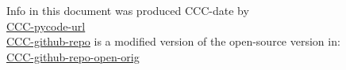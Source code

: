 {\footnotesize
\noindent
Info in this document was produced CCC-date by\\
\url{CCC-pycode-url}\\
\url{CCC-github-repo}
is a modified version of the open-source version in:\\
\url{CCC-github-repo-open-orig}
} %
